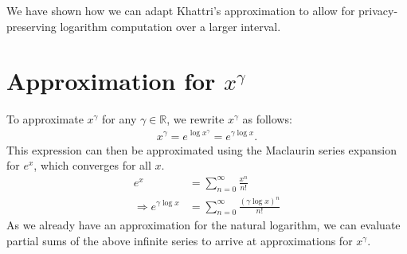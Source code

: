 We have shown how we can adapt Khattri's approximation to allow for privacy-preserving logarithm computation over a larger interval.

\section{Approximation for $x^\gamma$}
To approximate $x^\gamma$ for any $\gamma \in \mathbb{R}$, we rewrite $x^\gamma$ as follows:
\begin{align*}
  x^\gamma = e^{\log{x^\gamma}} = e^{\gamma\log{x}}.
\end{align*}
This expression can then be approximated using the Maclaurin series expansion for $e^x$, which converges for all $x$.
\begin{align*}
  e^x &= \sum_{n=0}^{\infty}{\frac{x^n}{n!}}\\
  \Rightarrow e^{\gamma\log{x}} &= \sum_{n=0}^{\infty}{\frac{(\gamma\log{x})^n}{n!}}
\end{align*}
As we already have an approximation for the natural logarithm, we can evaluate partial sums of the above infinite series to arrive at approximations for $x^\gamma$.
